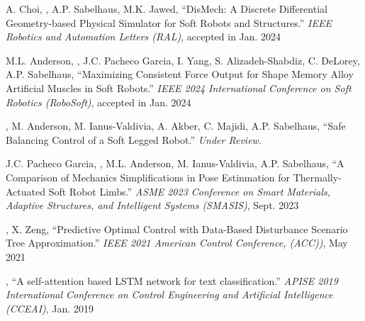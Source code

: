 { %
\begin{etaremune}[itemsep=0.0cm]
\item A. Choi, \myname, A.P. Sabelhaus, M.K. Jawed, ``DisMech: A Discrete Differential Geometry-based Physical Simulator for Soft Robots and Structures.'' {\it IEEE Robotics and Automation Letters (RAL)}, accepted in Jan. 2024   %

\item M.L. Anderson, \myname, J.C. Pacheco Garcia, I. Yang, S. Alizadeh-Shabdiz, C. DeLorey, A.P. Sabelhaus, ``Maximizing Consistent Force Output for Shape Memory Alloy Artificial Muscles in Soft Robots.'' {\it IEEE 2024 International Conference on Soft Robotics (RoboSoft)}, accepted in Jan. 2024  

\item \myname, M. Anderson, M. Ianus-Valdivia, A. Akber, C. Majidi, A.P. Sabelhaus, ``Safe Balancing Control of a Soft Legged Robot.'' {\it Under Review}.  

\item J.C. Pacheco Garcia, \myname, M.L. Anderson, M. Ianus-Valdivia, A.P. Sabelhaus, ``A Comparison of Mechanics Simplifications in Pose Estinmation for Thermally-Actuated Soft Robot Limbs.'' {\it ASME 2023 Conference on Smart Materials, Adaptive Structures, and Intelligent Systems (SMASIS)}, Sept. 2023 

\item \myname, X. Zeng, ``Predictive Optimal Control with Data-Based Disturbance Scenario Tree Approximation.'' {\it IEEE 2021 American Control Conference, (ACC))}, May 2021  

\item \myname, ``A self-attention based LSTM network for text classification.'' {\it APISE 2019 International Conference on Control Engineering and Artificial Intelligence (CCEAI)}, Jan. 2019  
\end{etaremune}
}





